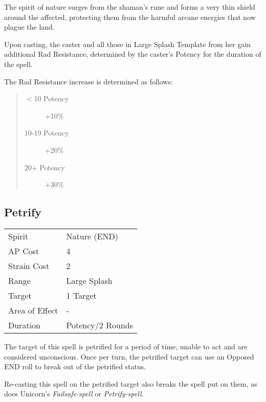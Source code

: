\documentclass[11pt,a4paper,twocolumn]{book}
\begin{document}
The spirit of nature surges from the shaman's rune and forms a very thin shield around the affected, protecting them from the harmful arcane energies that now plague the land.

Upon casting, the caster and all those in Large Splash Template from her gain additional Rad Resistance, determined by the caster's Potency for the duration of the spell. 

The Rad Resistance increase is determined as follows:
\begin{quote}
	\begin{description}
		\item[$<$10 Potency] 	+10\%
		\item[10-19 Potency] 	+20\%
		\item[20+ Potency]  	+30\%
	\end{description}	
\end{quote}


\subsection*{Petrify}
{
	\begin{tabu} to 70mm{| X[l,4] | X[l,7] |}
		\hline
		Spirit         & Nature (END)          \\
		AP Cost        & 4                     \\
		Strain Cost    & 2                     \\
		Range          & Large Splash          \\
		Target         & 1 Target              \\
		Area of Effect & -                     \\
		Duration       & Potency/2 Rounds \\ \hline
	\end{tabu}
	
}
\medskip

The target of this spell is petrified for a period of time, unable to act and are considered unconscious. Once per turn, the petrified target can use an Opposed END roll to break out of the petrified status. 

Re-casting this spell on the petrified target also breaks the spell put on them, as does Unicorn's \textit{Failsafe-spell} or \textit{Petrify-spell}.
\end{document}
